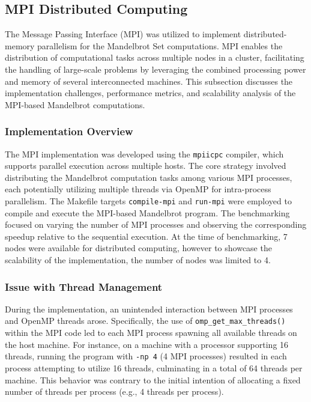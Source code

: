 \documentclass[
	report, %
	11pt, %
]{CSUniSchoolLabReport}
\newcounter{ct}
\begin{document}
\subsection{MPI Distributed Computing}

The Message Passing Interface (MPI) was utilized to implement distributed-memory parallelism for the Mandelbrot Set computations. MPI enables the distribution of computational tasks across multiple nodes in a cluster, facilitating the handling of large-scale problems by leveraging the combined processing power and memory of several interconnected machines. This subsection discusses the implementation challenges, performance metrics, and scalability analysis of the MPI-based Mandelbrot computations.

\subsubsection{Implementation Overview}

The MPI implementation was developed using the \texttt{mpiicpc} compiler, which supports parallel execution across multiple hosts. The core strategy involved distributing the Mandelbrot computation tasks among various MPI processes, each potentially utilizing multiple threads via OpenMP for intra-process parallelism. The Makefile targets \texttt{compile-mpi} and \texttt{run-mpi} were employed to compile and execute the MPI-based Mandelbrot program. The benchmarking focused on varying the number of MPI processes and observing the corresponding speedup relative to the sequential execution. At the time of benchmarking, 7 nodes were available for distributed computing, however to showcase the scalability of the implementation, the number of nodes was limited to 4.

\subsubsection{Issue with Thread Management}

During the implementation, an unintended interaction between MPI processes and OpenMP threads arose. Specifically, the use of \texttt{omp\_get\_max\_threads()} within the MPI code led to each MPI process spawning all available threads on the host machine. For instance, on a machine with a processor supporting 16 threads, running the program with \texttt{-np 4} (4 MPI processes) resulted in each process attempting to utilize 16 threads, culminating in a total of 64 threads per machine. This behavior was contrary to the initial intention of allocating a fixed number of threads per process (e.g., 4 threads per process).
\end{document}
